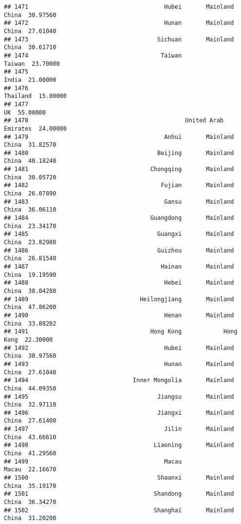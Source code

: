 \documentclass[
]{article}
\begin{document}
\begin{verbatim}
## 1471                                       Hubei       Mainland China  30.97560
## 1472                                       Hunan       Mainland China  27.61040
## 1473                                     Sichuan       Mainland China  30.61710
## 1474                                      Taiwan               Taiwan  23.70000
## 1475                                                            India  21.00000
## 1476                                                         Thailand  15.00000
## 1477                                                               UK  55.00000
## 1478                                             United Arab Emirates  24.00000
## 1479                                       Anhui       Mainland China  31.82570
## 1480                                     Beijing       Mainland China  40.18240
## 1481                                   Chongqing       Mainland China  30.05720
## 1482                                      Fujian       Mainland China  26.07890
## 1483                                       Gansu       Mainland China  36.06110
## 1484                                   Guangdong       Mainland China  23.34170
## 1485                                     Guangxi       Mainland China  23.82980
## 1486                                     Guizhou       Mainland China  26.81540
## 1487                                      Hainan       Mainland China  19.19590
## 1488                                       Hebei       Mainland China  38.04280
## 1489                                Heilongjiang       Mainland China  47.86200
## 1490                                       Henan       Mainland China  33.88202
## 1491                                   Hong Kong            Hong Kong  22.30000
## 1492                                       Hubei       Mainland China  30.97560
## 1493                                       Hunan       Mainland China  27.61040
## 1494                              Inner Mongolia       Mainland China  44.09350
## 1495                                     Jiangsu       Mainland China  32.97110
## 1496                                     Jiangxi       Mainland China  27.61400
## 1497                                       Jilin       Mainland China  43.66610
## 1498                                    Liaoning       Mainland China  41.29560
## 1499                                       Macau                Macau  22.16670
## 1500                                     Shaanxi       Mainland China  35.19170
## 1501                                    Shandong       Mainland China  36.34270
## 1502                                    Shanghai       Mainland China  31.20200

\end{verbatim}
\end{document}
